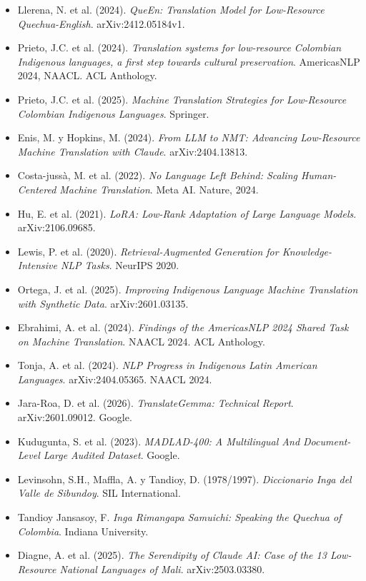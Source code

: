 \documentclass[12pt,a4paper]{article}
\begin{document}
\begin{itemize}[leftmargin=*]
    \item Llerena, N. et al. (2024). \textit{QueEn: Translation Model for Low-Resource Quechua-English}. arXiv:2412.05184v1.

    \item Prieto, J.C. et al. (2024). \textit{Translation systems for low-resource Colombian Indigenous languages, a first step towards cultural preservation}. AmericasNLP 2024, NAACL. ACL Anthology.

    \item Prieto, J.C. et al. (2025). \textit{Machine Translation Strategies for Low-Resource Colombian Indigenous Languages}. Springer.

    \item Enis, M. y Hopkins, M. (2024). \textit{From LLM to NMT: Advancing Low-Resource Machine Translation with Claude}. arXiv:2404.13813.

    \item Costa-jussà, M. et al. (2022). \textit{No Language Left Behind: Scaling Human-Centered Machine Translation}. Meta AI. Nature, 2024.

    \item Hu, E. et al. (2021). \textit{LoRA: Low-Rank Adaptation of Large Language Models}. arXiv:2106.09685.

    \item Lewis, P. et al. (2020). \textit{Retrieval-Augmented Generation for Knowledge-Intensive NLP Tasks}. NeurIPS 2020.

    \item Ortega, J. et al. (2025). \textit{Improving Indigenous Language Machine Translation with Synthetic Data}. arXiv:2601.03135.

    \item Ebrahimi, A. et al. (2024). \textit{Findings of the AmericasNLP 2024 Shared Task on Machine Translation}. NAACL 2024. ACL Anthology.

    \item Tonja, A. et al. (2024). \textit{NLP Progress in Indigenous Latin American Languages}. arXiv:2404.05365. NAACL 2024.

    \item Jara-Roa, D. et al. (2026). \textit{TranslateGemma: Technical Report}. arXiv:2601.09012. Google.

    \item Kudugunta, S. et al. (2023). \textit{MADLAD-400: A Multilingual And Document-Level Large Audited Dataset}. Google.

    \item Levinsohn, S.H., Maffla, A. y Tandioy, D. (1978/1997). \textit{Diccionario Inga del Valle de Sibundoy}. SIL International.

    \item Tandioy Jansasoy, F. \textit{Inga Rimangapa Samuichi: Speaking the Quechua of Colombia}. Indiana University.

    \item Diagne, A. et al. (2025). \textit{The Serendipity of Claude AI: Case of the 13 Low-Resource National Languages of Mali}. arXiv:2503.03380.
\end{itemize}
\end{document}
